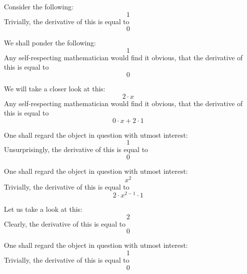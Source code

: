 \documentclass{article}
\begin{document}
Consider the following:
\begin{equation}
1 
\end{equation}
Trivially, the derivative of this is equal to
\begin{equation}
0 
\end{equation}

We shall ponder the following:
\begin{equation}
1 
\end{equation}
Any self-respecting mathematician would find it obvious, that the derivative of this is equal to
\begin{equation}
0 
\end{equation}

We will take a closer look at this:
\begin{equation}
2 \cdot x 
\end{equation}
Any self-respecting mathematician would find it obvious, that the derivative of this is equal to
\begin{equation}
0 \cdot x + 2 \cdot 1 
\end{equation}

One shall regard the object in question with utmost interest:
\begin{equation}
1 
\end{equation}
Unsurprisingly, the derivative of this is equal to
\begin{equation}
0 
\end{equation}

One shall regard the object in question with utmost interest:
\begin{equation}
x ^{2 } 
\end{equation}
Trivially, the derivative of this is equal to
\begin{equation}
2 \cdot x ^{2 - 1 } \cdot 1 
\end{equation}

Let us take a look at this:
\begin{equation}
2 
\end{equation}
Clearly, the derivative of this is equal to
\begin{equation}
0 
\end{equation}

One shall regard the object in question with utmost interest:
\begin{equation}
1 
\end{equation}
Trivially, the derivative of this is equal to
\begin{equation}
0 
\end{equation}
\end{document}
